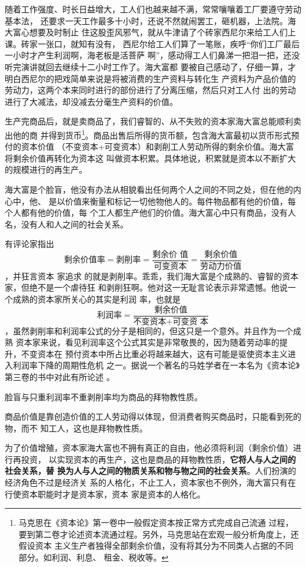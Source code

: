随着工作强度、时长日益增大，工人们也越来越不满，常常嚷嚷着工厂要遵守劳动基本法，
还要求一天工作最多十小时，还说不然就闹罢工，砸机器，上法院。海大富心想要及时制止
住这股歪风邪气，就从牛津请了个砖家西尼尔来给工人们上课。砖家一张口，就知有没有，
西尼尔给工人们算了一笔账，疾呼“你们工厂最后一小时才产生利润啊，海老板是活菩萨
啊”，感动得工人们鼻涕一把泪一把，还没听完演讲就回去继续十二小时工作了。海大富都
要被自己感动了，仔细一算，才明白西尼尔的把戏简单来说是将被消费的生产资料与转化生
产资料为产品价值的劳动力，这两个本来同时进行的部份进行了分离压缩，然后只对工人付
出的劳动进行了大减法，却没减去分毫生产资料的价值。\bigskip


生产完商品后，就是卖商品了，我们睿智的、从不失败的资本家海大富总能顺利卖出他的商
并得到货币\footnote{马克思在《资本论》第一卷中一般假定资本按正常方式完成自己流通
  过程，要到第二卷才论述资本流通过程。另外，马克思站在宏观一般分析角度上，还假设资本
  主义生产者独得全部剩余价值，没有将其分为不同类人占据的不同部分。如利润、利息、
  租金、税收等。}。商品出售后所得的货币额，包含海大富最初以货币形式预付的资本价值
（不变资本+可变资本）和剥削工人劳动所得的剩余价值。海大富将剩余价值再转化为资本这
叫做资本积累。具体地说，积累就是资本以不断扩大的规模进行的再生产。 \bigskip

海大富是个脸盲，他没有办法从相貌看出任何两个人之间的不同之处，但在他的内心中，他、
是以价值来衡量和标记一切他物他人的。每件物品都有他的价值，每个人都有他的价值，每
个工人都生产他们的价值。海大富心中只有商品，没有人名，没有人和人之间的社会关系。

有评论家指出\[\mbox{剩余价值率} = \mbox{剥削率} = \frac{\mbox{剩余价
值}}{\mbox{可变资本}} = \frac{\mbox{剩余价值}}{\mbox{劳动力价值}}\]，并狂言资本
家追求  的就是剥削率。乖乖，我们海大富是个成熟的、睿智的资本家，但绝不是一个虐待狂
和剥削狂啊。他对这一无耻言论表示非常遗憾。他说一个成熟的资本家所关心的其实是利润
率，也就是\[\mbox{利润率} = \frac{\mbox{剩余价值}}{\mbox{不变资本}+\mbox{可变资
本}}\]，虽然剥削率和利润率公式的分子是相同的，但这只是一个意外。并且作为一个成熟
资本家来说，看见利润率这个公式其实是非常敬畏的，因为随着劳动率的提升，不变资本在
预付资本中所占比重必将越来越大，这有可能是驱使资本主义进入利润率下降的周期性危机
之一。据说一个著名的马姓学者在一本名为《资本论》第三卷的书中对此有所论述
。

脸盲与只重利润率不重剥削率均为商品的拜物教性质。

商品价值是靠创造价值的工人劳动得以体现，但消费者购买商品时，只能看到死的物，而不
知工人，这也是拜物教性质。

为了价值增殖，资本家海大富也不拥有真正的自由，他必须将利润（剩余价值）进行再投资，
以实现资本的再生产，这也是商品的拜物教性质，\textbf{它将人与人之间的社会关系，替
  换为人与人之间的物质关系和物与物之间的社会关系}。人们扮演的经济角色不过是经济关
系的人格化，不止工人，资本家也不例外，海大富只有在行使资本职能时才是资本家，资本
家是资本的人格化。 \bigskip

